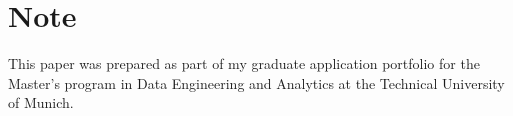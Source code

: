 \section*{Note}

This paper was prepared as part of my graduate application portfolio for the Master's program in Data Engineering and Analytics at the Technical University of Munich.

